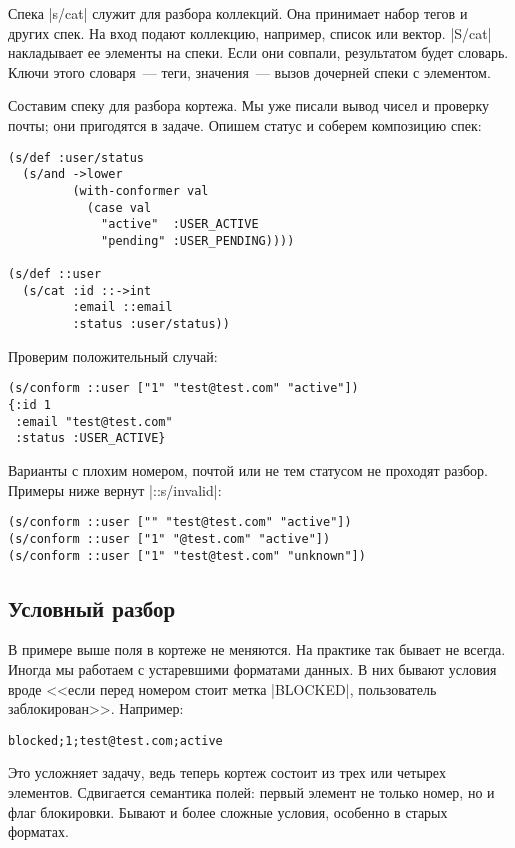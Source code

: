 Спека \spverb|s/cat| служит для разбора коллекций. Она принимает набор тегов и
других спек. На вход подают коллекцию, например, список или
вектор. \spverb|S/cat| накладывает ее элементы на спеки. Если они совпали,
результатом будет словарь. Ключи этого словаря~--- теги, значения~--- вызов
дочерней спеки с элементом.

Составим спеку для разбора кортежа. Мы уже писали вывод чисел и проверку почты;
они пригодятся в задаче. Опишем статус и соберем композицию спек:

\begin{verbatim}
(s/def :user/status
  (s/and ->lower
         (with-conformer val
           (case val
             "active"  :USER_ACTIVE
             "pending" :USER_PENDING))))

(s/def ::user
  (s/cat :id ::->int
         :email ::email
         :status :user/status))
\end{verbatim}

\noindent
Проверим положительный случай:

\begin{verbatim}
(s/conform ::user ["1" "test@test.com" "active"])
{:id 1
 :email "test@test.com"
 :status :USER_ACTIVE}
\end{verbatim}

Варианты с плохим номером, почтой или не тем статусом не проходят
разбор. Примеры ниже вернут \spverb|::s/invalid|:

\begin{verbatim}
(s/conform ::user ["" "test@test.com" "active"])
(s/conform ::user ["1" "@test.com" "active"])
(s/conform ::user ["1" "test@test.com" "unknown"])
\end{verbatim}

\subsection{Условный разбор}

В примере выше поля в кортеже не меняются. На практике так бывает не
всегда. Иногда мы работаем с устаревшими форматами данных. В них бывают условия
вроде <<если перед номером стоит метка \spverb|BLOCKED|, пользователь
заблокирован>>. Например:

\begin{verbatim}
blocked;1;test@test.com;active
\end{verbatim}

Это усложняет задачу, ведь теперь кортеж состоит из трех или четырех
элементов. Сдвигается семантика полей: первый элемент не только номер, но и флаг
блокировки. Бывают и более сложные условия, особенно в старых форматах.

